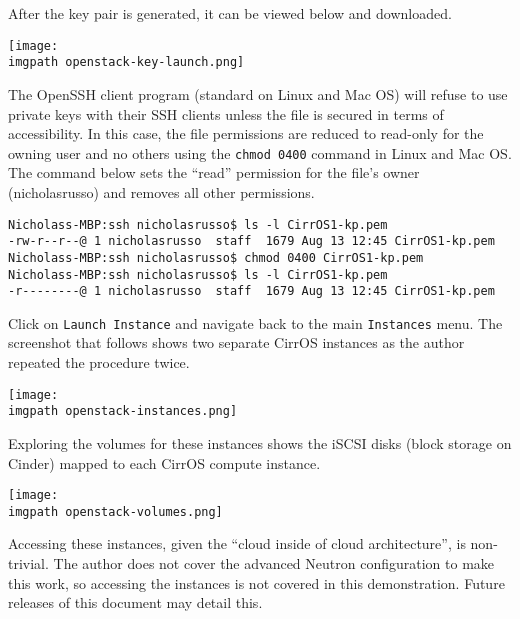 After the key pair is generated, it can be viewed below and downloaded.

    \begin{minipage}[t]{\linewidth}
	  \centering
      \texttt{[image: \\imgpath openstack-key-launch.png]}
    \end{minipage}

The OpenSSH client program (standard on Linux and Mac OS) will refuse to use
private keys with their SSH clients unless the file is secured in terms of
accessibility. In this case, the file permissions are reduced to read-only for
the owning user and no others using the \verb|chmod 0400| command in Linux and
Mac OS\@. The command below sets the ``read'' permission for the file's owner
(nicholasrusso) and removes all other permissions.

\begin{verbatim}
Nicholass-MBP:ssh nicholasrusso$ ls -l CirrOS1-kp.pem
-rw-r--r--@ 1 nicholasrusso  staff  1679 Aug 13 12:45 CirrOS1-kp.pem
Nicholass-MBP:ssh nicholasrusso$ chmod 0400 CirrOS1-kp.pem
Nicholass-MBP:ssh nicholasrusso$ ls -l CirrOS1-kp.pem
-r--------@ 1 nicholasrusso  staff  1679 Aug 13 12:45 CirrOS1-kp.pem
\end{verbatim}

Click on \verb|Launch Instance| and navigate back to the main \verb|Instances|
menu. The screenshot that follows shows two separate CirrOS instances
as the author repeated the procedure twice.

    \begin{minipage}[t]{\linewidth}
	  \centering
      \texttt{[image: \\imgpath openstack-instances.png]}
    \end{minipage}

Exploring the volumes for these instances shows the iSCSI disks (block storage
on Cinder) mapped to each CirrOS compute instance.

    \begin{minipage}[t]{\linewidth}
	  \centering
      \texttt{[image: \\imgpath openstack-volumes.png]}
    \end{minipage}

Accessing these instances, given the ``cloud inside of cloud architecture'',
is non-trivial. The author does not cover the advanced Neutron configuration
to make this work, so accessing the instances is not covered in this
demonstration. Future releases of this document may detail this. \\

